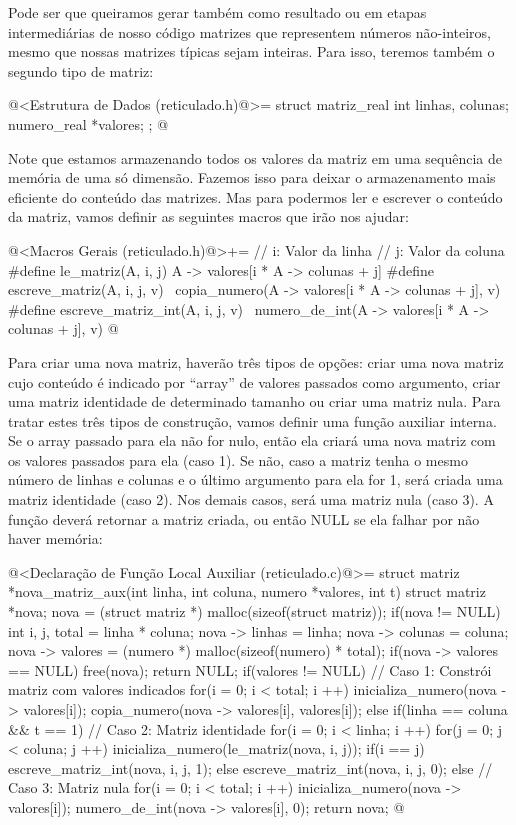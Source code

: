 Pode ser que queiramos gerar também como resultado ou em etapas
intermediárias de nosso código matrizes que representem números
não-inteiros, mesmo que nossas matrizes típicas sejam inteiras. Para
isso, teremos também o segundo tipo de matriz:

\iniciocodigo
@<Estrutura de Dados (reticulado.h)@>=
struct matriz_real{
  int linhas, colunas;
  numero_real *valores;
};
@
\fimcodigo


Note que estamos armazenando todos os valores da matriz em uma
sequência de memória de uma só dimensão. Fazemos isso para deixar o
armazenamento mais eficiente do conteúdo das matrizes. Mas para
podermos ler e escrever o conteúdo da matriz, vamos definir as
seguintes macros que irão nos ajudar:

\iniciocodigo
@<Macros Gerais (reticulado.h)@>+=
// i: Valor da linha     // j: Valor da coluna
#define le_matriz(A, i, j) A -> valores[i * A -> colunas + j]
#define escreve_matriz(A, i, j, v)                    \
        copia_numero(A -> valores[i * A -> colunas + j], v)
#define escreve_matriz_int(A, i, j, v)                \
        numero_de_int(A -> valores[i * A -> colunas + j], v)
@
\fimcodigo

Para criar uma nova matriz, haverão três tipos de opções: criar uma
nova matriz cujo conteúdo é indicado por ``array'' de valores passados
como argumento, criar uma matriz identidade de determinado tamanho ou
criar uma matriz nula. Para tratar estes três tipos de construção,
vamos definir uma função auxiliar interna. Se o array passado para ela
não for nulo, então ela criará uma nova matriz com os valores passados
para ela (caso 1). Se não, caso a matriz tenha o mesmo número de
linhas e colunas e o último argumento para ela for 1, será criada uma
matriz identidade (caso 2). Nos demais casos, será uma matriz nula
(caso 3). A função deverá retornar a matriz criada, ou então NULL se
ela falhar por não haver memória:

\iniciocodigo
@<Declaração de Função Local Auxiliar (reticulado.c)@>=
struct matriz *nova_matriz_aux(int linha, int coluna, numero *valores,
                               int t){
  struct matriz *nova;
  nova = (struct matriz *) malloc(sizeof(struct matriz));
  if(nova != NULL){
    int i, j, total = linha * coluna;
    nova -> linhas = linha;
    nova -> colunas = coluna;
    nova -> valores = (numero *) malloc(sizeof(numero) * total);
    if(nova -> valores == NULL){
      free(nova);
      return NULL;
    }
    if(valores != NULL){ // Caso 1: Constrói matriz com valores indicados
      for(i = 0; i < total; i ++){
        inicializa_numero(nova -> valores[i]);
        copia_numero(nova -> valores[i], valores[i]);
      }
    }
    else if(linha == coluna && t == 1){ // Caso 2: Matriz identidade
      for(i = 0; i < linha; i ++)
        for(j = 0; j < coluna; j ++){
          inicializa_numero(le_matriz(nova, i, j));
          if(i == j)
            escreve_matriz_int(nova, i, j, 1);
          else
            escreve_matriz_int(nova, i, j, 0);
        }
    }
    else{ // Caso 3: Matriz nula
      for(i = 0; i < total; i ++){
        inicializa_numero(nova -> valores[i]);
        numero_de_int(nova -> valores[i], 0);
      }
    }
  }
  return nova;
}
@
\fimcodigo

